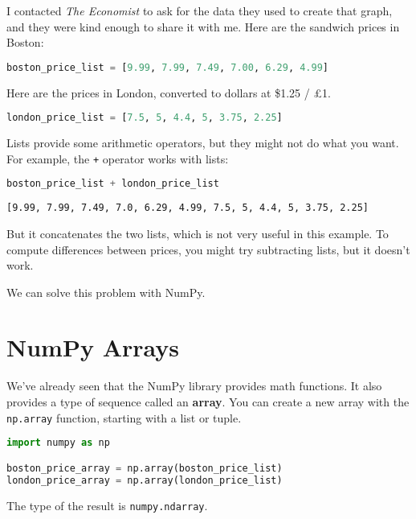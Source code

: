 \documentclass[
]{book}
\newcommand{\passthrough}[1]{#1}
\begin{document}
I contacted \emph{The Economist} to ask for the data they used to create
that graph, and they were kind enough to share it with me. Here are the
sandwich prices in Boston:

\begin{lstlisting}[language=Python]
boston_price_list = [9.99, 7.99, 7.49, 7.00, 6.29, 4.99]
\end{lstlisting}

Here are the prices in London, converted to dollars at \$1.25 / £1.

\begin{lstlisting}[language=Python]
london_price_list = [7.5, 5, 4.4, 5, 3.75, 2.25]
\end{lstlisting}

Lists provide some arithmetic operators, but they might not do what you
want. For example, the \passthrough{\lstinline!+!} operator works with
lists:

\begin{lstlisting}[language=Python]
boston_price_list + london_price_list
\end{lstlisting}

\begin{lstlisting}
[9.99, 7.99, 7.49, 7.0, 6.29, 4.99, 7.5, 5, 4.4, 5, 3.75, 2.25]
\end{lstlisting}

But it concatenates the two lists, which is not very useful in this
example. To compute differences between prices, you might try
subtracting lists, but it doesn't work.

We can solve this problem with NumPy.

\section{NumPy Arrays}\label{numpy-arrays}

We've already seen that the NumPy library provides math functions. It
also provides a type of sequence called an \textbf{array}. You can
create a new array with the \passthrough{\lstinline!np.array!} function,
starting with a list or tuple.

\begin{lstlisting}[language=Python]
import numpy as np

boston_price_array = np.array(boston_price_list)
london_price_array = np.array(london_price_list)
\end{lstlisting}

The type of the result is \passthrough{\lstinline!numpy.ndarray!}.
\end{document}
